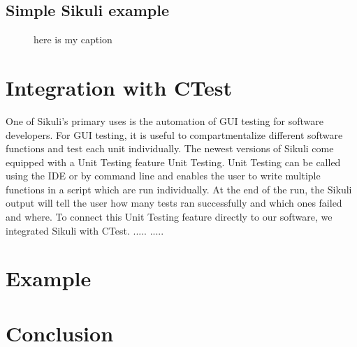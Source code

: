 \documentclass{InsightArticle}
\begin{document}
 


\subsection{Simple Sikuli example} %

\begin{figure}[htp]
 \centering
 \caption{here is my caption}
 \label{fig:SimpleExample}
\end{figure}

\section{Integration with CTest}
One of Sikuli's primary uses is the automation of GUI testing for software
developers.  For GUI testing, it is useful to compartmentalize different software functions and test each unit
individually.  The newest versions of Sikuli come equipped with a Unit Testing feature 
Unit Testing.  Unit Testing can be called using the IDE or by command
line and enables the user to write multiple functions in a script which are
run individually.  At the end of the run, the Sikuli output will tell the user
how many tests ran successfully and which ones failed and where.  To connect this
Unit Testing feature directly to our software, we integrated Sikuli with CTest.
.....
.....


\section{Example}

\section{Conclusion}

\clearpage



\end{document}
